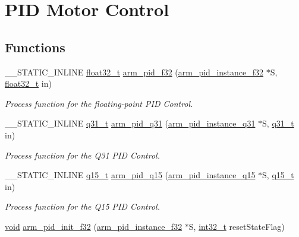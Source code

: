 \hypertarget{group___p_i_d}{\section{P\-I\-D Motor Control}
\label{group___p_i_d}
}
\subsection*{Functions}
\begin{DoxyCompactItemize}
\item 
\-\_\-\-\_\-\-S\-T\-A\-T\-I\-C\-\_\-\-I\-N\-L\-I\-N\-E \hyperlink{arm__math_8h_a4611b605e45ab401f02cab15c5e38715}{float32\-\_\-t} \hyperlink{group___p_i_d_ga0966be6524a009a64c7db4b4fe212fba}{arm\-\_\-pid\-\_\-f32} (\hyperlink{structarm__pid__instance__f32}{arm\-\_\-pid\-\_\-instance\-\_\-f32} $\ast$S, \hyperlink{arm__math_8h_a4611b605e45ab401f02cab15c5e38715}{float32\-\_\-t} in)
\begin{DoxyCompactList}\small\item\em Process function for the floating-\/point P\-I\-D Control. \end{DoxyCompactList}\item 
\-\_\-\-\_\-\-S\-T\-A\-T\-I\-C\-\_\-\-I\-N\-L\-I\-N\-E \hyperlink{arm__math_8h_adc89a3547f5324b7b3b95adec3806bc0}{q31\-\_\-t} \hyperlink{group___p_i_d_ga1206601b7f7f5c045ded56c8c7deabee}{arm\-\_\-pid\-\_\-q31} (\hyperlink{structarm__pid__instance__q31}{arm\-\_\-pid\-\_\-instance\-\_\-q31} $\ast$S, \hyperlink{arm__math_8h_adc89a3547f5324b7b3b95adec3806bc0}{q31\-\_\-t} in)
\begin{DoxyCompactList}\small\item\em Process function for the Q31 P\-I\-D Control. \end{DoxyCompactList}\item 
\-\_\-\-\_\-\-S\-T\-A\-T\-I\-C\-\_\-\-I\-N\-L\-I\-N\-E \hyperlink{arm__math_8h_ab5a8fb21a5b3b983d5f54f31614052ea}{q15\-\_\-t} \hyperlink{group___p_i_d_gac82bd6ccb2b4395ead06ddefe481a244}{arm\-\_\-pid\-\_\-q15} (\hyperlink{structarm__pid__instance__q15}{arm\-\_\-pid\-\_\-instance\-\_\-q15} $\ast$S, \hyperlink{arm__math_8h_ab5a8fb21a5b3b983d5f54f31614052ea}{q15\-\_\-t} in)
\begin{DoxyCompactList}\small\item\em Process function for the Q15 P\-I\-D Control. \end{DoxyCompactList}\item 
\hyperlink{group___n_a_m_e_ga18028b8badbf1ea7e704ccac3c488e82}{void} \hyperlink{group___p_i_d_gae31536b19b82b93ed184fb1ab73cfcb3}{arm\-\_\-pid\-\_\-init\-\_\-f32} (\hyperlink{structarm__pid__instance__f32}{arm\-\_\-pid\-\_\-instance\-\_\-f32} $\ast$S, \hyperlink{group___n_a_m_e_gafd12020da5a235dfcf0c3c748fb5baed}{int32\-\_\-t} reset\-State\-Flag)

\end{DoxyCompactItemize}
